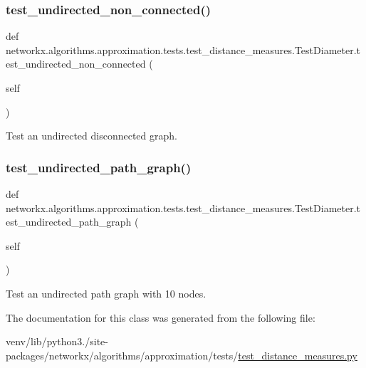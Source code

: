\subsubsection{\texorpdfstring{test\+\_\+undirected\+\_\+non\+\_\+connected()}{test\_undirected\_non\_connected()}}
{\footnotesize\ttfamily def networkx.\+algorithms.\+approximation.\+tests.\+test\+\_\+distance\+\_\+measures.\+Test\+Diameter.\+test\+\_\+undirected\+\_\+non\+\_\+connected (\begin{DoxyParamCaption}\item[{}]{self }\end{DoxyParamCaption})}

\begin{DoxyVerb}Test an undirected disconnected graph.\end{DoxyVerb}
 \mbox{\label{classnetworkx_1_1algorithms_1_1approximation_1_1tests_1_1test__distance__measures_1_1TestDiameter_a8e75f665416a0c841fd2177648a161db}} 
\subsubsection{\texorpdfstring{test\+\_\+undirected\+\_\+path\+\_\+graph()}{test\_undirected\_path\_graph()}}
{\footnotesize\ttfamily def networkx.\+algorithms.\+approximation.\+tests.\+test\+\_\+distance\+\_\+measures.\+Test\+Diameter.\+test\+\_\+undirected\+\_\+path\+\_\+graph (\begin{DoxyParamCaption}\item[{}]{self }\end{DoxyParamCaption})}

\begin{DoxyVerb}Test an undirected path graph with 10 nodes.\end{DoxyVerb}
 

The documentation for this class was generated from the following file\+:\begin{DoxyCompactItemize}
\item 
venv/lib/python3./site-\/packages/networkx/algorithms/approximation/tests/\hyperlink{approximation_2tests_2test__distance__measures_8py}{test\+\_\+distance\+\_\+measures.\+py}\end{DoxyCompactItemize}
